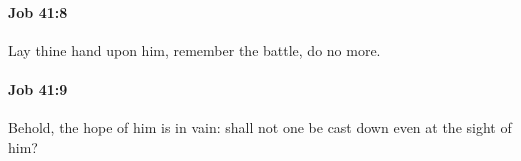 		\paragraph{Job 41:8} %
			\label{JOB-41-8}

			Lay thine hand upon him, remember the battle, do no more.


		\paragraph{Job 41:9} %
			\label{JOB-41-9}

			Behold, the hope of him is in vain: shall not one be cast down even at the sight of him?



